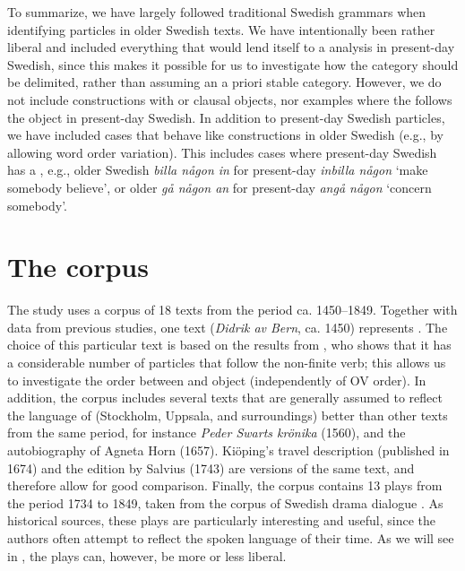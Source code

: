 \documentclass[output=paper]{langscibook}
\begin{document}
To summarize, we have largely followed traditional Swedish grammars when identifying particles in older Swedish texts. We have intentionally been rather liberal and included everything that would lend itself to a  analysis in present-day Swedish, since this makes it possible for us to investigate how the  category should be delimited, rather than assuming an a priori stable category. However, we do not include constructions with  or clausal objects, nor examples where the  follows the object in present-day Swedish. In addition to present-day Swedish particles, we have included cases that behave like  constructions in older Swedish (e.g., by allowing word order variation). This includes cases where present-day Swedish has a , e.g., older Swedish \textit{billa någon in} for present-day \textit{inbilla någon} ‘make somebody believe’, or older \textit{gå någon an} for present-day \textit{angå någon} ‘concern somebody’.


\section{The corpus}\label{sec:lalu:3}


The study uses a corpus of 18 texts from the period ca. 1450–1849. Together with data from previous studies, one text (\textit{Didrik av Bern}, ca. 1450) represents . The choice of this particular text is based on the results from \citet{Ljunggren1932}, who shows that it has a considerable number of particles that follow the non-finite verb; this allows us to investigate the order between  and object (independently of OV order). In addition, the corpus includes several texts that are generally assumed to reflect the language of  (Stockholm, Uppsala, and surroundings) better than other texts from the same period, for instance \textit{Peder Swarts krönika} (1560), and the autobiography of Agneta Horn (1657). Kiöping’s travel description (published in 1674) and the edition by Salvius (1743) are versions of the same text, and therefore allow for good comparison. Finally, the corpus contains 13 plays from the period 1734 to 1849, taken from the corpus of Swedish drama dialogue \citep{MarttalaStromquist2001}. As historical sources, these plays are particularly interesting and useful, since the authors often attempt to reflect the spoken language of their time. As we will see in , the plays can, however, be more or less liberal.
\end{document}
